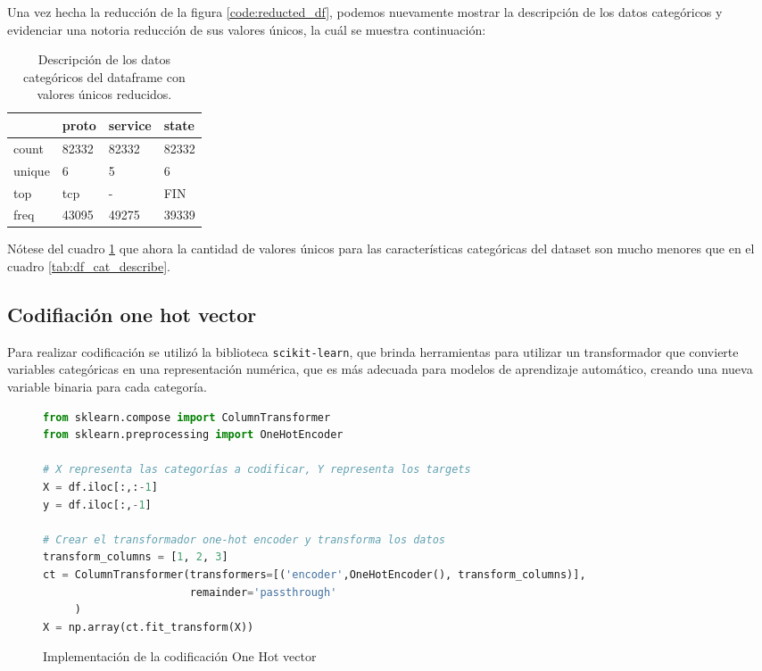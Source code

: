 \documentclass{article}
\begin{document}
Una vez hecha la reducción de la figura \ref{code:reducted_df}, podemos nuevamente mostrar la descripción  de los datos categóricos y evidenciar una notoria reducción de sus valores únicos, la cuál se muestra continuación:

\begin{table}[htbp]
    \centering
    
    \begin{tabular}{llll}
    \toprule
     & proto & service & state \\
    \midrule
    count & 82332 & 82332 & 82332 \\
    unique & 6 & 5 & 6 \\
    top & tcp & - & FIN \\
    freq & 43095 & 49275 & 39339 \\
    \bottomrule
    \end{tabular}

    \caption{Descripción de los datos categóricos del dataframe con valores únicos reducidos.}
    \label{tab:df_reduced}
\end{table}

Nótese del cuadro \ref{tab:df_reduced} que ahora la cantidad de valores únicos para las características categóricas del dataset son mucho menores que en el cuadro \ref{tab:df_cat_describe}.

\subsection{Codifiación one hot vector}

Para realizar codificación se utilizó la biblioteca \texttt{scikit-learn}, que brinda herramientas para utilizar un transformador que convierte variables categóricas en una representación numérica, que es más adecuada para modelos de aprendizaje automático, creando una nueva variable binaria para cada categoría.

\begin{figure}[htbp]
\begin{lstlisting}[language=Python, texcl=True]
from sklearn.compose import ColumnTransformer
from sklearn.preprocessing import OneHotEncoder

# X representa las categorías a codificar, Y representa los targets
X = df.iloc[:,:-1]
y = df.iloc[:,-1]

# Crear el transformador one-hot encoder y transforma los datos
transform_columns = [1, 2, 3]
ct = ColumnTransformer(transformers=[('encoder',OneHotEncoder(), transform_columns)],
                       remainder='passthrough'
     )
X = np.array(ct.fit_transform(X))
\end{lstlisting}
    \caption{Implementación de la codificación One Hot vector}
    \label{code:oneHotEncoder}
\end{figure}
\end{document}
